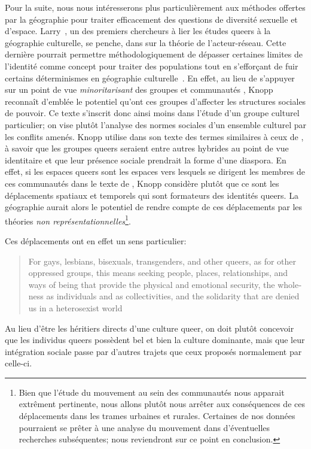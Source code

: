 Pour la suite, nous nous intéresserons plus particulièrement aux méthodes offertes par la géographie pour traiter efficacement des questions de diversité sexuelle et d'espace.
Larry~\citet{Knopp2004}, un des premiers chercheurs à lier les études queers à la géographie culturelle, se penche, dans  sur la théorie de l'acteur-réseau.
Cette dernière pourrait permettre méthodologiquement de dépasser certaines limites de l'identité comme concept pour traiter des populations \lgbt{} tout en s’efforçant de fuir certains déterminismes en géographie culturelle~\citep{Knopp2004}.
En effet, au lieu de s'appuyer sur un point de vue \emph{minoritarisant} des groupes et communautés \lgbt{}, Knopp reconnaît d'emblée le potentiel qu'ont ces groupes d'affecter les structures sociales de pouvoir.
Ce texte s'inscrit donc ainsi moins dans l'étude d'un groupe culturel particulier; on vise plutôt l'analyse des normes sociales d'un ensemble culturel par les conflits amenés.
Knopp utilise dans son texte des termes similaires à ceux de \citet{Sinfield1996}, à savoir que les groupes queers seraient entre autres hybrides au point de vue identitaire et que leur présence sociale prendrait la forme d'une diaspora.
En effet, si les espaces queers sont les espaces vers lesquels se dirigent les membres de ces communautés dans le texte de \citet{Sinfield1996}, Knopp considère plutôt que ce sont les déplacements spatiaux et temporels qui sont formateurs des identités queers.
La géographie aurait alors le potentiel de rendre compte de ces déplacements par les théories \emph{non représentationnelles}\footnote{Bien que l'étude du mouvement au sein des communautés \lgbt{} nous apparait extrêment pertinente, nous allons plutôt nous arrêter aux conséquences de ces déplacements dans les trames urbaines et rurales. Certaines de nos données pourraient se prêter à une analyse du mouvement dans d'éventuelles recherches subséquentes; nous reviendront sur ce point en conclusion.}.

Ces déplacements ont en effet un sens particulier: \foreignblockquote{english}[{\cite[123]{Knopp2004}}][.]{For gays, lesbians, bisexuals, transgenders, and other queers, as for other oppressed groups, this means seeking people, places, relationships, and ways of being that provide the physical and emotional security, the wholeness as individuals and as collectivities, and the solidarity that are denied us in a heterosexist world}
Au lieu d'être les héritiers directs d'une culture queer{}, on doit plutôt concevoir que les individus queers{} possèdent bel et bien la culture dominante, mais que leur intégration sociale passe par d'autres trajets que ceux proposés normalement par celle-ci.

